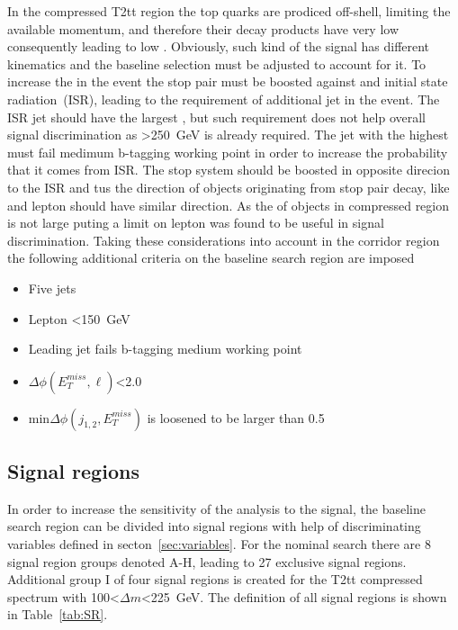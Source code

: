 In the compressed T2tt region the top quarks are prodiced off-shell, limiting the available momentum,  and therefore their decay products have very low \pt consequently leading to low \MET. Obviously, such kind of the signal has different kinematics and the baseline selection must be adjusted to account for it. To increase the \MET in the event the stop pair must be boosted against and initial state radiation~(ISR), leading to the requirement of additional jet in the event. The ISR jet should have the largest \pt, but such requirement does not help overall signal discrimination as \MET>250~GeV is already required. The jet with the highest \pt must fail medimum b-tagging working point in order to increase the probability that it comes from ISR. The stop system should be boosted in opposite direcion to the ISR and tus the direction of objects originating from stop pair decay, like \MET and lepton should have similar direction. As the \pt of objects in compressed region is not large puting a limit on lepton \pt was found to be useful in signal discrimination. Taking these considerations into account in the corridor region the following additional criteria on the baseline search region  are imposed

\begin{itemize}
\item Five jets
\item Lepton \pt<150~GeV
\item Leading jet fails b-tagging medium working point
\item $\Delta \phi(E_{T}^{miss}, \ell)$<2.0 
\item min$\Delta \phi (j_{1,2}, E_{T}^{miss})$ is loosened to be larger than  0.5

\end{itemize}

\subsection{Signal regions~\label{sec:sr}}

In order to increase the sensitivity of the analysis to the signal, the baseline search region can be divided into signal regions with help of discriminating variables defined in secton~\ref{sec:variables}. For the nominal search there are 8 signal region groups denoted A-H, leading to 27 exclusive signal regions. Additional group I of four signal regions is created for the T2tt compressed spectrum with 100<$\Delta m$<225~GeV. The definition of all signal regions is shown in Table~\ref{tab:SR}.

